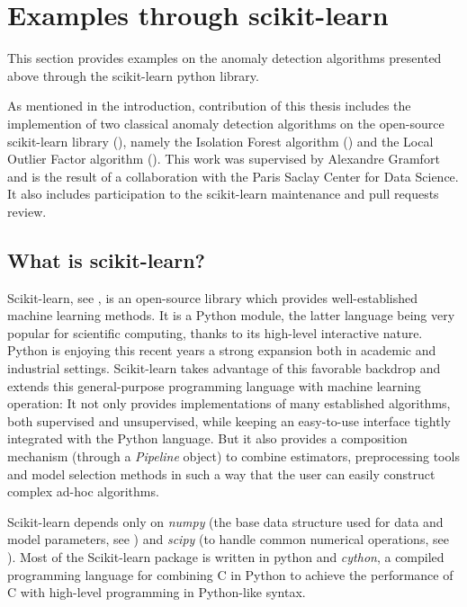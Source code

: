 \section{Examples through scikit-learn}
\label{back:sklearn-contribution}
This section provides examples on the anomaly detection algorithms presented above through the scikit-learn python library.

As mentioned in the introduction, contribution of this thesis includes the implemention of two classical anomaly detection algorithms on the open-source scikit-learn library (\cite{sklearn2011}), namely the Isolation Forest algorithm (\cite{Liu2008}) and the Local Outlier Factor algorithm (\cite{Breunig2000LOF}). %
This work was supervised by Alexandre Gramfort and is the result of a collaboration with the Paris Saclay Center for Data Science. It also includes participation to the scikit-learn maintenance and pull requests review.



\subsection{What is scikit-learn?}
Scikit-learn, see \cite{sklearn2011}, is an open-source library which provides well-established machine learning methods.
It is a Python module, the latter language being very popular for scientific computing, thanks to its high-level interactive nature. Python is enjoying this recent years a strong expansion both in academic and industrial settings. Scikit-learn takes advantage of this favorable backdrop and extends this general-purpose programming language with machine learning operation: It not only provides implementations of many established algorithms, both supervised and unsupervised, while keeping an easy-to-use interface tightly integrated with the Python language. But it also provides a composition mechanism (through a \emph{Pipeline} object) to combine estimators, preprocessing tools and model selection methods in such a way that the user can easily construct complex ad-hoc algorithms.

Scikit-learn depends only on \emph{numpy} (the base data structure used for data and model parameters, see \cite{Vanderwalt2011numpy}) and \emph{scipy} (to handle common numerical operations, see \cite{Jones2015scipy}).
Most of the Scikit-learn package is written in python and \emph{cython}, a compiled programming language for combining C in Python to achieve the performance of C with high-level programming in Python-like syntax.


